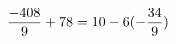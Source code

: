 \documentclass[preview]{standalone}
\begin{document}
\begin{align*}
\special{dvisvgm:raw <g id='unique000'>}\frac{-408}{9} + 78 = 10 - 6 (- \frac{34}{9})\special{dvisvgm:raw </g>}
\end{align*}
\end{document}

